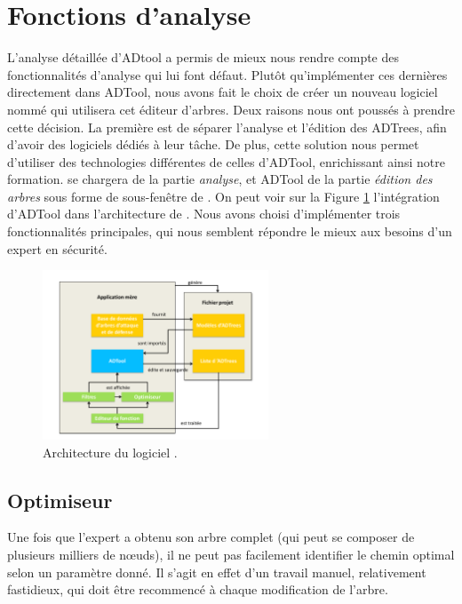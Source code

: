 \section{Fonctions d'analyse}

	L'analyse détaillée d'ADtool a permis de mieux nous rendre compte des fonctionnalités d'analyse qui lui font défaut. Plutôt qu'implémenter ces dernières directement dans ADTool, nous avons fait le choix de créer un nouveau logiciel nommé \glasir{} qui utilisera cet éditeur d'arbres. Deux raisons nous ont poussés à prendre cette décision. La première est de séparer l'analyse et l'édition des ADTrees, afin d'avoir des logiciels dédiés à leur tâche. De plus, cette solution nous permet d'utiliser des technologies différentes de celles d'ADTool, enrichissant ainsi notre formation. \glasir{} se chargera de la partie \textit{analyse}, et ADTool de la partie \textit{édition des arbres} sous forme de sous-fenêtre de \glasir{}. On peut voir sur la {\sc Figure} \ref{fig:architecture_Glasir} l'intégration d'ADTool dans l'architecture de \glasir{}. Nous avons choisi d'implémenter trois fonctionnalités principales, qui nous semblent répondre le mieux aux besoins d'un expert en sécurité.

		\begin{figure}[h!]
			\centering
				\includegraphics[width=0.6\textwidth]{figure/archiGlasir.pdf}
			\caption{Architecture du logiciel \glasir.}
			\label{fig:architecture_Glasir}
		\end{figure}

		\subsection{Optimiseur}
		\label{subsection:optimiseur}
		Une fois que l'expert a obtenu son arbre complet (qui peut se composer de plusieurs milliers de nœuds), il ne peut pas facilement identifier le chemin optimal selon un paramètre donné. Il s'agit en effet d'un travail manuel, relativement fastidieux, qui doit être recommencé à chaque modification de l'arbre.
		

